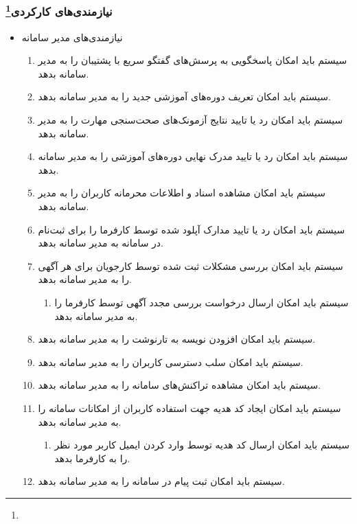 \documentclass[12pt]{article}
\begin{document}
	\subsubsection{نیازمندی‌های کارکردی\footnote{}}
	\begin{itemize}
		\item
		نیازمندی‌های مدیر سامانه
		\begin{enumerate}
			\renewcommand{\labelenumi}{-R\arabic{enumi}}
			\item سیستم باید امکان پاسخگویی به پرسش‌های گفتگو سریع با پشتیبان را به مدیر سامانه بدهد.
			\item سیستم باید امکان تعریف دوره‌های آموزشی جدید را به مدیر سامانه بدهد.
			\item سیستم باید امکان رد یا تایید نتایج آزمونک‌های صحت‌سنجی مهارت را به مدیر سامانه بدهد.
			\item سیستم باید امکان رد یا تایید مدرک نهایی دوره‌های آموزشی را به مدیر سامانه بدهد.
			\item سیستم باید امکان مشاهده اسناد و اطلاعات محرمانه کاربران را به مدیر سامانه بدهد.
			\item سیستم باید امکان رد یا تایید مدارک آپلود شده توسط کارفرما را برای ثبت‌نام در سامانه به مدیر سامانه بدهد.
			\item سیستم باید امکان بررسی مشکلات ثبت شده توسط کارجویان برای هر آگهی را به مدیر سامانه بدهد.
			\begin{enumerate}
				\renewcommand{\labelenumii}{-R\arabic{enumi}.\arabic{enumii}}
				\item سیستم باید امکان ارسال درخواست بررسی مجدد آگهی توسط کارفرما را به مدیر سامانه بدهد.
			\end{enumerate}
			\item سیستم باید امکان افزودن نویسه به تارنوشت را به مدیر سامانه بدهد.
			\item سیستم باید امکان سلب دسترسی کاربران را به مدیر سامانه بدهد.
			\item سیستم باید امکان مشاهده تراکنش‌های سامانه را به مدیر سامانه بدهد.
			\item سیستم باید امکان ایجاد کد هدیه جهت استفاده کاربران از امکانات سامانه را به مدیر سامانه بدهد.
			\begin{enumerate}
				\renewcommand{\labelenumii}{-R\arabic{enumi}.\arabic{enumii}}
				\item سیستم باید امکان ارسال کد هدیه توسط وارد کردن ایمیل کاربر مورد نظر را به کارفرما بدهد.
			\end{enumerate}
			\item سیستم باید امکان ثبت پیام در سامانه را به مدیر سامانه بدهد.

\end{enumerate}
\end{itemize}
\end{document}
